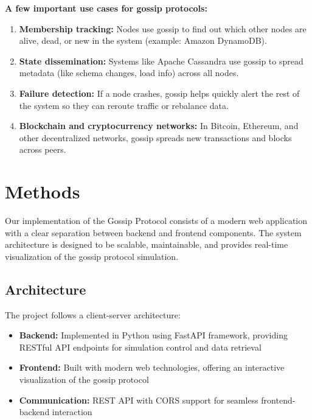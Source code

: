 \documentclass[a4paper,12pt]{article}
\begin{document}
\textbf{A few important use cases for gossip protocols:}
\begin{enumerate}
    \item \textbf{Membership tracking:} Nodes use gossip to find out which other nodes are alive, dead, or new in the system (example: Amazon DynamoDB).
    \item \textbf{State dissemination:} Systems like Apache Cassandra use gossip to spread metadata (like schema changes, load info) across all nodes.
    \item \textbf{Failure detection:} If a node crashes, gossip helps quickly alert the rest of the system so they can reroute traffic or rebalance data.
    \item \textbf{Blockchain and cryptocurrency networks:} In Bitcoin, Ethereum, and other decentralized networks, gossip spreads new transactions and blocks across peers.
\end{enumerate}

\section{Methods}

Our implementation of the Gossip Protocol consists of a modern web application with a clear separation between backend and frontend components. The system architecture is designed to be scalable, maintainable, and provides real-time visualization of the gossip protocol simulation.

\subsection{Architecture}
The project follows a client-server architecture:
\begin{itemize}
    \item \textbf{Backend:} Implemented in Python using FastAPI framework, providing RESTful API endpoints for simulation control and data retrieval
    \item \textbf{Frontend:} Built with modern web technologies, offering an interactive visualization of the gossip protocol
    \item \textbf{Communication:} REST API with CORS support for seamless frontend-backend interaction
\end{itemize}
\end{document}
